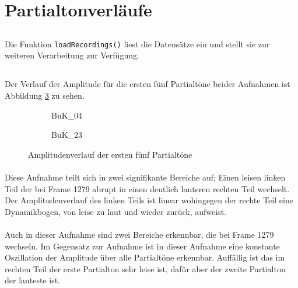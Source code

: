 \section{Partialtonverläufe}
\label{sec:1}

\subsection{}
Die Funktion \texttt{loadRecordings()} liest die Datensätze ein und stellt sie zur weiteren Verarbeitung zur Verfügung.

\subsection{}
Der Verlauf der Amplitude für die ersten fünf Partialtöne beider Aufnahmen ist Abbildung \ref{fig:ampl} zu sehen.

\begin{figure}[tbh]
    \centering
    \begin{subfigure}{.5\textwidth}
        \centering
        \caption{BuK\_04}
        \scalebox{0.5}{}
        \label{fig:amp04}
    \end{subfigure}%
    \begin{subfigure}{.5\textwidth}
        \centering
        \caption{BuK\_23}
        \scalebox{0.5}{}
        \label{fig:amp23}
    \end{subfigure}
    \caption{Amplitudenverlauf der ersten fünf Partialtöne}
    \label{fig:ampl}
\end{figure}

\paragraph{}
Diese Aufnahme teilt sich in zwei signifikante Bereiche auf;
Einen leisen linken Teil der bei Frame 1279 abrupt in einen deutlich lauteren rechten Teil wechselt.
Der Amplitudenverlauf des linken Teils ist linear wohingegen der rechte Teil eine Dynamikbogen, von leise zu laut und wieder zurück, aufweist.

\paragraph{}
Auch in dieser Aufnahme sind zwei Bereiche erkennbar, die bei Frame 1279 wechseln.
Im Gegensatz zur Aufnahme  ist in dieser Aufnahme eine konstante Oszillation der Amplitude über alle Partialtöne erkennbar.
Auffällig ist das im rechten Teil der erste Partialton sehr leise ist, dafür aber der zweite Partialton der lauteste ist.


